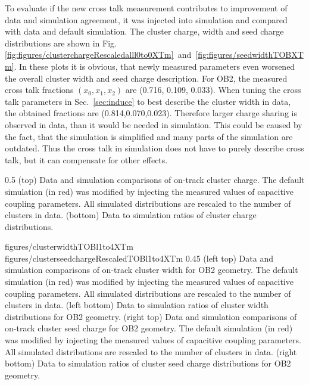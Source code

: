 To evaluate if the new cross talk measurement contributes to improvement of data and simulation agreement, it was injected into simulation and compared with data and default simulation. The cluster charge, width and seed charge distributions are shown in Fig.\ref{fig:figures/clusterchargeRescaledalll0to0XTm}~and~\ref{fig:figures/seedwidthTOBXTm}. In these plots it is obvious, that newly measured parameters even worsened the overall cluster width and seed charge description. For OB2, the measured cross talk fractions $(x_{0}, x_{1}, x_{2})$ are (0.716, 0.109, 0.033). When tuning the cross talk parameters in Sec.~\ref{sec:induce} to best describe the cluster width in data, the obtained fractions are (0.814,0.070,0.023). Therefore larger charge sharing is observed in data, than it would be needed in simulation. This could be caused by the fact, that the simulation is simplified and many parts of the simulation are outdated. Thus the cross talk in simulation does not have to purely describe cross talk, but it can compensate for other effects. 


                 {0.5}       %
                 { (top) Data and simulation comparisons of on-track cluster charge. The default simulation (in red) was modified by injecting the measured values of capacitive coupling parameters. All simulated distributions are rescaled to the number of clusters in data. (bottom) Data to simulation ratios of cluster charge distributions. }

                 {figures/clusterwidthTOBl1to4XTm}
                 {figures/clusterseedchargeRescaledTOBl1to4XTm} %
                 {0.45}       %
                 {(left top) Data and simulation comparisons of on-track cluster width for OB2 geometry. The default simulation (in red) was modified by injecting the measured values of capacitive coupling parameters. All simulated distributions are rescaled to the number of clusters in data. (left bottom) Data to simulation ratios of cluster width distributions for OB2 geometry. (right top) Data and simulation comparisons of on-track cluster seed charge for OB2 geometry. The default simulation (in red) was modified by  injecting the measured values of capacitive coupling parameters. All simulated distributions are rescaled to the number of clusters in data. (right bottom) Data to simulation ratios of cluster seed charge distributions for OB2 geometry. }

